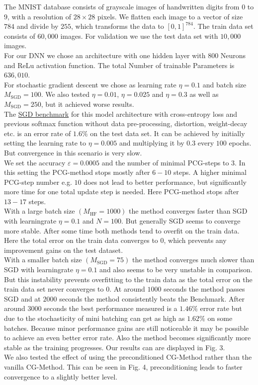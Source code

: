 \documentclass[conference]{IEEEtran}
\begin{document}
	\noindent
	The MNIST database consists of grayscale images of handwritten digits from $0$ to $9$, with a resolution of $28\times28$ pixels. We flatten each image to a vector of size $784$ and divide by $255$, which transforms the data to $[0,1]^{784}$. The train data set consists of $60,000$ images. For validation we use the test data set with $10,000$ images.\\
	For our DNN we chose an architecture with one hidden layer with $800$ Neurons and ReLu activation function. The total Number of trainable Parameters is $636,010$.\\
	For stochastic gradient descent we chose as learning rate $\eta=0.1$ and batch size $M_{\mathrm{SGD}}=100$. We also tested $\eta=0.01$, $\eta=0.025$ and $\eta=0.3$ as well as $M_{\mathrm{SGD}}=250$, but it achieved worse results. \\
	The \href{https://en.wikipedia.org/wiki/MNIST_database}{SGD benchmark} for this model architecture with cross-entropy loss and previous softmax function without data pre-processing, distortion, weight-decay etc. is an error rate of $1.6\%$ on the test data set.
	It can be achieved by initially setting the learning rate to $\eta=0.005$ and multiplying it by $0.3$ every $100$ epochs. But convergence in this scenario is very slow.\\
	\noindent
	We set the accuracy $\varepsilon=0.0005$ and the number of minimal PCG-steps to $3$. In this setting the PCG-method stops mostly after $6-10$ steps. A higher minimal PCG-step number e.g. $10$ does not lead to better performance, but significantly more time for one total update step is needed. Here PCG-method stops after $13-17$ steps.\\
	With a large batch size $(M_{\mathrm{HF}}=1000)$ the method converges faster than SGD with learningrate $\eta=0.1$ and $N=100.$ But generally SGD seems to converge more stable. After some time both methods tend to overfit on the train data. Here the total error on the train data converges to $0$, which prevents any improvement gains on the test dataset.\\
	With a smaller batch size $(M_{\mathrm{SGD}}=75)$ the method converges much slower than SGD with learningrate $\eta=0.1$ and also seems to be very unstable in comparison. But this instability prevents overfitting to the train data as the total error on the train data set never converges to $0$. At around $1000$ seconds the method passes SGD and at $2000$ seconds the method consistently beats the Benchmark. After around $3000$ seconds the best performance measured is a $1.46\%$ error rate but due to the stochasticity of mini batching can get as high as $1.62\%$ on some batches. Because minor performance gains are still noticeable it may be possible to achieve an even better error rate.
	Also the method becomes significantly more stable as the training progresses. Our results can are displayed in Fig. 3.\\
	We also tested the effect of using the preconditioned CG-Method rather than the vanilla CG-Method. This can be seen in Fig. 4, preconditioning leads to faster convergence to a slightly better level.
\end{document}
